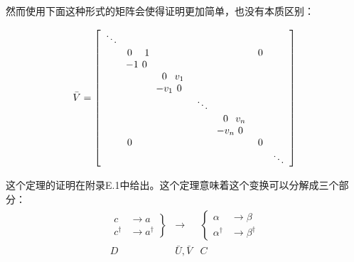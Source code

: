 \begin{booknote*}
然而使用下面这种形式的矩阵会使得证明更加简单，也没有本质区别：

\[
\bar{V}=\left[\begin{array}{rrrrrrrr}
\ddots\\
 & 0 & \makebox[0pt]{\ensuremath{1}} &  &  &  & 0\\
 & \makebox[0pt]{\ensuremath{-1}} & \text{0}\\
 &  &  & \begin{array}{cc}
0 & \text{\makebox[0pt]{\ensuremath{v_{1}}}}\\
\text{\makebox[0pt]{\ensuremath{-v_{1}}}} & 0
\end{array}\\
 &  &  &  & \ddots\\
 &  &  &  &  & \begin{array}{cc}
0 & \text{\makebox[0pt]{\ensuremath{v_{n}}}}\\
\text{\makebox[0pt]{\ensuremath{-v_{n}}}} & 0
\end{array}\\
 & 0 &  &  &  &  & 0\\
 &  &  &  &  &  &  & \ddots
\end{array}\right]
\]
\end{booknote*}
这个定理的证明在附录E.1中给出。这个定理意味着这个变换可以分解成三个部分：
\begin{align*}
\begin{array}{ccc}
\left.\begin{array}{cc}
c & \rightarrow a\\
c^{\dagger} & \rightarrow a^{\dagger}
\end{array}\right\}  & \longrightarrow & \left\{ \begin{array}{cc}
\alpha & \rightarrow\beta\\
\alpha^{\dagger} & \rightarrow\beta^{\dagger}
\end{array}\right.\\
D & \bar{U},\bar{V} & C
\end{array}
\end{align*}

